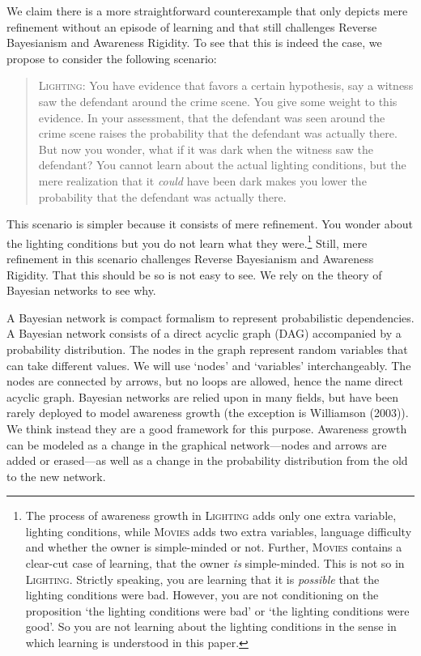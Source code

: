 \documentclass[
  11pt,
  dvipsnames,enabledeprecatedfontcommands]{scrartcl}
\begin{document}
\label{sec:better}

We claim there is a more straightforward counterexample that only
depicts mere refinement without an episode of learning and that still
challenges Reverse Bayesianism and Awareness Rigidity. To see that this
is indeed the case, we propose to consider the following scenario:

\begin{quote}
\textsc{Lighting:} You have evidence that favors a certain hypothesis,
say a witness saw the defendant around the crime scene. You give some
weight to this evidence. In your assessment, that the defendant was seen
around the crime scene raises the probability that the defendant was
actually there. But now you wonder, what if it was dark when the witness
saw the defendant? You cannot learn about the actual lighting
conditions, but the mere realization that it \textit{could} have been
dark makes you lower the probability that the defendant was actually
there.
\end{quote}

\doublespace

\noindent This scenario is simpler because it consists of mere
refinement. You wonder about the lighting conditions but you do not
learn what they were.\footnote{The process of awareness growth in
  \textsc{Lighting} adds only one extra variable, lighting conditions,
  while \textsc{Movies} adds two extra variables, language difficulty
  and whether the owner is simple-minded or not. Further,
  \textsc{Movies} contains a clear-cut case of learning, that the owner
  \emph{is} simple-minded. This is not so in \textsc{Lighting}. Strictly
  speaking, you are learning that it is \emph{possible} that the
  lighting conditions were bad. However, you are not conditioning on the
  proposition `the lighting conditions were bad' or `the lighting
  conditions were good'. So you are not learning about the lighting
  conditions in the sense in which learning is understood in this paper.}
Still, mere refinement in this scenario challenges Reverse Bayesianism
and Awareness Rigidity. That this should be so is not easy to see. We
rely on the theory of Bayesian networks to see why.

A Bayesian network is compact formalism to represent probabilistic
dependencies. A Bayesian network consists of a direct acyclic graph
(DAG) accompanied by a probability distribution. The nodes in the graph
represent random variables that can take different values. We will use
`nodes' and `variables' interchangeably. The nodes are connected by
arrows, but no loops are allowed, hence the name direct acyclic graph.
Bayesian networks are relied upon in many fields, but have been rarely
deployed to model awareness growth (the exception is Williamson (2003)).
We think instead they are a good framework for this purpose. Awareness
growth can be modeled as a change in the graphical network---nodes and
arrows are added or erased---as well as a change in the probability
distribution from the old to the new network.
\end{document}
